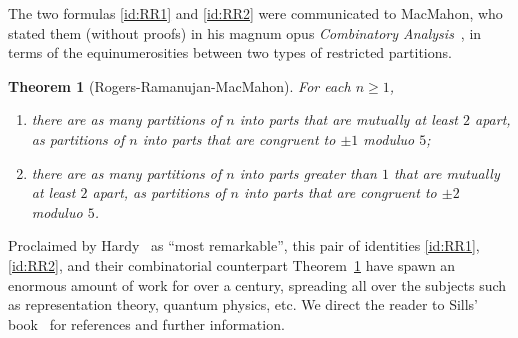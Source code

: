 \documentclass[11pt,reqno]{amsart}
\numberwithin{equation}{section}
\theoremstyle{plain}
\newtheorem{theorem}{Theorem}[section]
\theoremstyle{definition}
\begin{document}
The two formulas \eqref{id:RR1} and \eqref{id:RR2} were communicated to MacMahon, who stated them (without proofs) in his magnum opus {\it Combinatory Analysis}~\cite[Vol.~I, Sect.~VII, Ch.~III]{mac15}, in terms of the equinumerosities between two types of restricted partitions.
\begin{theorem}[Rogers-Ramanujan-MacMahon]\label{thm:RR-partition}
For each $n\ge 1$,
\begin{enumerate}
  \item there are as many partitions of $n$ into parts that are mutually at least $2$ apart, as partitions of $n$ into parts that are congruent to $\pm 1$ moduluo $5$;
  \item there are as many partitions of $n$ into parts greater than $1$ that are mutually at least $2$ apart, as partitions of $n$ into parts that are congruent to $\pm 2$ moduluo $5$.
\end{enumerate}
\end{theorem}

Proclaimed by Hardy~\cite[p.~28]{har37} as ``most remarkable'', this pair of identities \eqref{id:RR1}, \eqref{id:RR2}, and their combinatorial counterpart Theorem~\ref{thm:RR-partition} have spawn an enormous amount of work for over a century, spreading all over the subjects such as representation theory, quantum physics, etc. We direct the reader to Sills' book~\cite{sil18} for references and further information. 
\end{document}
